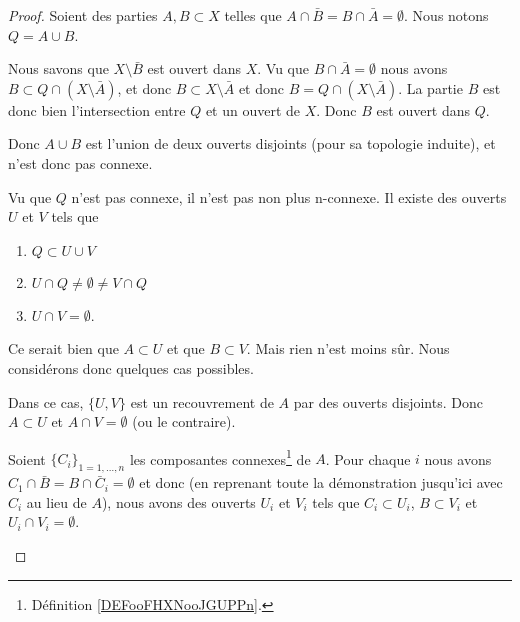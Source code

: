 \begin{proof}
	Soient des parties \( A,B\subset X\)  telles que \( A\cap\bar B=B\cap\bar A=\emptyset\). Nous notons \( Q=A\cup B\).
	\begin{subproof}
		\spitem[\( B\) est ouvert dans \(Q= A\cup B\)]
		Nous savons que \( X\setminus \bar B\) est ouvert dans \( X\). Vu que \( B\cap\bar A=\emptyset\) nous avons \( B\subset Q\cap(X\setminus\bar A)\), et donc \( B\subset X\setminus \bar A\) et donc \( B=Q\cap(X\setminus \bar A)\). La partie \( B\) est donc bien l'intersection entre \( Q\) et un ouvert de \( X\). Donc \( B\) est ouvert dans \( Q\).

		Donc \( A\cup B\) est l'union de deux ouverts disjoints (pour sa topologie induite), et n'est donc pas connexe.

		Vu que \( Q\) n'est pas connexe, il n'est pas non plus n-connexe. Il existe des ouverts \( U\) et \( V\) tels que
		\begin{enumerate}
			\item
			      \( Q\subset U\cup V\)
			\item
			      \( U\cap Q\neq\emptyset\neq V\cap Q\)
			\item
			      \( U\cap V=\emptyset\).
		\end{enumerate}

		Ce serait bien que \( A\subset U\) et que \( B\subset V\). Mais rien n'est moins sûr. Nous considérons donc quelques cas possibles.

		Dans ce cas, \( \{ U,V \}\) est un recouvrement de \( A\) par des ouverts disjoints. Donc \( A\subset U\) et \( A\cap V=\emptyset\) (ou le contraire).

		Soient \( \{ C_i \}_{1=1,\ldots,n}\) les composantes connexes\footnote{Définition \ref{DEFooFHXNooJGUPPn}.} de \( A\). Pour chaque \( i\) nous avons \( C_1\cap\bar B=B\cap\bar C_i=\emptyset\) et donc (en reprenant toute la démonstration jusqu'ici avec \( C_i\) au lieu de \( A\)), nous avons des ouverts \( U_i\) et \( V_i\) tels que \( C_i\subset U_i\), \( B\subset V_i\) et \( U_i\cap V_i= \emptyset\). %


\end{subproof}
\end{proof}
